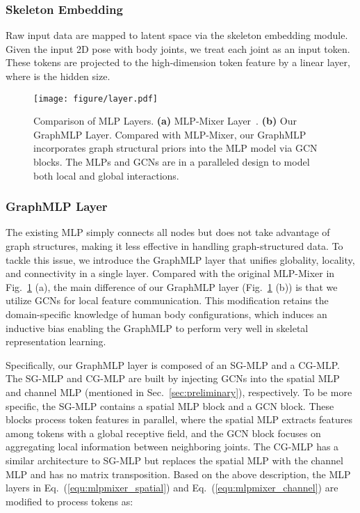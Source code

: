 \documentclass[lettersize,journal]{IEEEtran}
\begin{document}
\subsubsection{Skeleton Embedding}
Raw input data are mapped to latent space via the skeleton embedding module. 
Given the input 2D pose  with  body joints, we treat each joint as an input token. 
These tokens are projected to the high-dimension token feature  by a linear layer, where  is the hidden size. 

\begin{figure}[tb]
  \centering
  \texttt{[image: figure/layer.pdf]}
  \caption
  {
    Comparison of MLP Layers. 
    \textbf{(a)} MLP-Mixer Layer~\cite{mlpmixer}. 
    \textbf{(b)} Our GraphMLP Layer.
    Compared with MLP-Mixer, our GraphMLP incorporates graph structural priors into the MLP model via GCN blocks. 
    The MLPs and GCNs are in a paralleled design to model both local and global interactions. 
  }
  \label{fig:layer}
\end{figure}

\subsubsection{GraphMLP Layer}
The existing MLP simply connects all nodes but does not take advantage of graph structures, making it less effective in handling graph-structured data. 
To tackle this issue, we introduce the GraphMLP layer that unifies globality, locality, and connectivity in a single layer. 
Compared with the original MLP-Mixer in Fig.~\ref{fig:layer} (a), the main difference of our GraphMLP layer (Fig.~\ref{fig:layer} (b)) is that we utilize GCNs for local feature communication. 
This modification retains the domain-specific knowledge of human body configurations, which induces an inductive bias enabling the GraphMLP to perform very well in skeletal representation learning. 

Specifically, our GraphMLP layer is composed of an SG-MLP and a CG-MLP. 
The SG-MLP and CG-MLP are built by injecting GCNs into the spatial MLP and channel MLP (mentioned in Sec.~\ref{sec:preliminary}), respectively. 
To be more specific, the SG-MLP contains a spatial MLP block and a GCN block. 
These blocks process token features in parallel, where the spatial MLP extracts features among tokens with a global receptive field, and the GCN block focuses on aggregating local information between neighboring joints. 
The CG-MLP has a similar architecture to SG-MLP but replaces the spatial MLP with the channel MLP and has no matrix transposition. 
Based on the above description, the MLP layers in Eq.~(\ref{equ:mlpmixer_spatial}) and Eq.~(\ref{equ:mlpmixer_channel}) are modified to process tokens as:
\end{document}
